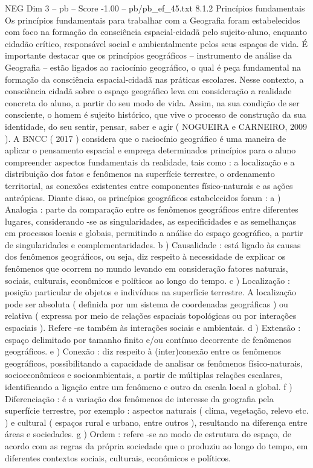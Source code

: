 \begin{textsample}{NEG Dim 3 – pb – Score -1.00 – pb/pb\_ef\_45.txt}  \label{ex:f3_neg_201}
8.1.2 Princípios fundamentais Os princípios fundamentais para trabalhar com a Geografia foram estabelecidos com foco na formação da consciência espacial-cidadã pelo sujeito-aluno, enquanto cidadão crítico, responsável social e ambientalmente pelos seus espaços de vida.
É importante destacar que os princípios geográficos – instrumento de análise da Geografia – estão ligados ao raciocínio geográfico, o qual é peça fundamental na formação da consciência espacial-cidadã nas práticas escolares.
Nesse contexto, a consciência cidadã sobre o espaço geográfico leva em consideração a realidade concreta do aluno, a partir do seu modo de vida.
Assim, na sua condição de ser consciente, o homem é sujeito histórico, que vive o processo de construção da sua identidade, do seu sentir, pensar, saber e agir ( NOGUEIRA e CARNEIRO, 2009 ).
A BNCC ( 2017 ) considera que o raciocínio geográfico é uma maneira de aplicar o pensamento espacial e emprega determinados princípios para o aluno compreender aspectos fundamentais da realidade, tais como : a localização e a distribuição dos fatos e fenômenos na superfície terrestre, o ordenamento territorial, as conexões existentes entre componentes físico-naturais e as ações antrópicas.
Diante disso, os princípios geográficos estabelecidos foram : a ) Analogia : parte da comparação entre os fenômenos geográficos entre diferentes lugares, considerando -se as singularidades, as especificidades e as semelhanças em processos locais e globais, permitindo a análise do espaço geográfico, a partir de singularidades e complementaridades. b ) Causalidade : está ligado às causas dos fenômenos geográficos, ou seja, diz respeito à necessidade de explicar os fenômenos que ocorrem no mundo levando em consideração fatores naturais, sociais, culturais, econômicos e políticos ao longo do tempo. c ) Localização : posição particular de objetos e indivíduos na superfície terrestre.
A localização pode ser absoluta ( definida por um sistema de coordenadas geográficas ) ou relativa ( expressa por meio de relações espaciais topológicas ou por interações espaciais ).
Refere -se também às interações sociais e ambientais. d ) Extensão : espaço delimitado por tamanho finito e/ou contínuo decorrente de fenômenos geográficos. e ) Conexão : diz respeito à (inter)conexão entre os fenômenos geográficos, possibilitando a capacidade de analisar os fenômenos físico-naturais, socioeconômicos e socioambientais, a partir de múltiplas relações escalares, identificando a ligação entre um fenômeno e outro da escala local a global. f ) Diferenciação : é a variação dos fenômenos de interesse da geografia pela superfície terrestre, por exemplo : aspectos naturais ( clima, vegetação, relevo etc. ) e cultural ( espaços rural e urbano, entre outros ), resultando na diferença entre áreas e sociedades. g ) Ordem : refere -se ao modo de estrutura do espaço, de acordo com as regras da própria sociedade que o produziu ao longo do tempo, em diferentes contextos sociais, culturais, econômicos e políticos.

\end{textsample}
